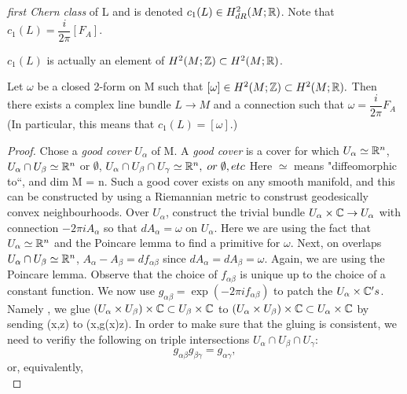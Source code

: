 \textit{first Chern class} of L and is denoted $c_1(L) \in H_{dR}^{2}(M;\mathbb{R})$. Note that $c_1(L) = \dfrac{i}{2\pi}[F_A]$.
\begin{remark}
 $c_1(L)$ is actually an element of $H^2(M;\mathbb{Z}) \subset H^2(M;\mathbb{R})$.
\end{remark}
\begin{theorem}
 Let $\omega$ be a closed 2-form on M such that $[\omega] \in H^2(M;\mathbb{Z}) \subset H^2(M;\mathbb{R}).$ Then there exists a complex
 line bundle $L \rightarrow M$ and a connection \nab such that $\omega = \dfrac{i}{2\pi}F_A$(In particular, this means that 
 $c_1(L) = [\omega].$)
 \begin{proof}
  Chose a \textit{good cover} $U_\alpha$ of M. A \textit{good cover} is a cover for which $U_\alpha \simeq \mathbb{R}^n$,\
  $U_\alpha \cap U_\beta \simeq \mathbb{R}^n$ or $\emptyset$, $U_\alpha \cap U_\beta \cap U_\gamma \simeq \mathbb{R}^n,\;or\;\emptyset,etc$
  Here $\simeq$ means "diffeomorphic to``, and dim M = n. Such a good cover exists on any smooth manifold, and this can be
  constructed by using a Riemannian metric to construst geodesically convex neighbourhoods.
  \newline Over $U_\alpha$, construct the trivial bundle $U_\alpha \times \mathbb{C} \rightarrow U_\alpha$ with connection
  $-2\pi i A_\alpha$ so that $d A_\alpha = \omega$ on $ U_\alpha$. Here we are using the fact that $U_\alpha \simeq \mathbb{R}^n$
  and the Poincare lemma to find a primitive for $\omega$.
  \newline Next, on overlaps $U_\alpha \cap U_\beta \simeq \mathbb{R}^n$, $A_\alpha - A_\beta = df_{\alpha \beta}$
  since $dA_\alpha = dA_\beta = \omega$. Again, we are using the Poincare lemma. Observe that the choice of $f_{\alpha \beta}
  $ is unique up to the choice of a constant function.
  \newline We now use $g_{\alpha \beta} = \exp(-2\pi i f_{\alpha \beta})$ to patch the $U_\alpha \times \mathbb{C} 's$. Namely
 , we glue $(U_\alpha \times U_\beta) \times \mathbb{C} \subset U_\beta \times \mathbb{C}$ to $(U_\alpha \times U_\beta) \times \mathbb{C} \subset U_\alpha 
 \times \mathbb{C}$ by sending (x,z) to (x,g(x)z). 
 \newline In order to make sure that the gluing is consistent, we need to verifiy the following on triple intersections
 $U_\alpha \cap U_\beta \cap U_\gamma$: 
 \begin{equation*}
  g_{\alpha \beta}g_{\beta \gamma} = g_{\alpha \gamma},
 \end{equation*}
 or, equivalently, 
 \begin{equation}

\end{equation}
\end{proof}
\end{theorem}
